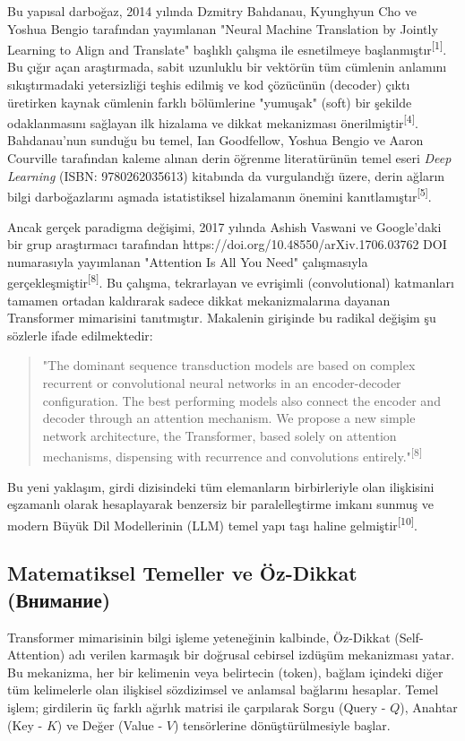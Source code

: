 \documentclass[11pt,a4paper]{article}
\begin{document}
Bu yapısal darboğaz, 2014 yılında Dzmitry Bahdanau, Kyunghyun Cho ve Yoshua Bengio tarafından yayımlanan "Neural Machine Translation by Jointly Learning to Align and Translate" başlıklı çalışma ile esnetilmeye başlanmıştır\textsuperscript{[1]}. Bu çığır açan araştırmada, sabit uzunluklu bir vektörün tüm cümlenin anlamını sıkıştırmadaki yetersizliği teşhis edilmiş ve kod çözücünün (decoder) çıktı üretirken kaynak cümlenin farklı bölümlerine "yumuşak" (soft) bir şekilde odaklanmasını sağlayan ilk hizalama ve dikkat mekanizması önerilmiştir\textsuperscript{[4]}. Bahdanau'nun sunduğu bu temel, Ian Goodfellow, Yoshua Bengio ve Aaron Courville tarafından kaleme alınan derin öğrenme literatürünün temel eseri \textit{Deep Learning} (ISBN: 9780262035613) kitabında da vurgulandığı üzere, derin ağların bilgi darboğazlarını aşmada istatistiksel hizalamanın önemini kanıtlamıştır\textsuperscript{[5]}.

Ancak gerçek paradigma değişimi, 2017 yılında Ashish Vaswani ve Google'daki bir grup araştırmacı tarafından https://doi.org/10.48550/arXiv.1706.03762 DOI numarasıyla yayımlanan "Attention Is All You Need" çalışmasıyla gerçekleşmiştir\textsuperscript{[8]}. Bu çalışma, tekrarlayan ve evrişimli (convolutional) katmanları tamamen ortadan kaldırarak sadece dikkat mekanizmalarına dayanan Transformer mimarisini tanıtmıştır. Makalenin girişinde bu radikal değişim şu sözlerle ifade edilmektedir:

\begin{quote}
"The dominant sequence transduction models are based on complex recurrent or convolutional neural networks in an encoder-decoder configuration. The best performing models also connect the encoder and decoder through an attention mechanism. We propose a new simple network architecture, the Transformer, based solely on attention mechanisms, dispensing with recurrence and convolutions entirely."\textsuperscript{[8]}
\end{quote}
Bu yeni yaklaşım, girdi dizisindeki tüm elemanların birbirleriyle olan ilişkisini eşzamanlı olarak hesaplayarak benzersiz bir paralelleştirme imkanı sunmuş ve modern Büyük Dil Modellerinin (LLM) temel yapı taşı haline gelmiştir\textsuperscript{[10]}.

\subsection{Matematiksel Temeller ve Öz-Dikkat (Внимание)}
Transformer mimarisinin bilgi işleme yeteneğinin kalbinde, Öz-Dikkat (Self-Attention) adı verilen karmaşık bir doğrusal cebirsel izdüşüm mekanizması yatar. Bu mekanizma, her bir kelimenin veya belirtecin (token), bağlam içindeki diğer tüm kelimelerle olan ilişkisel sözdizimsel ve anlamsal bağlarını hesaplar. Temel işlem; girdilerin üç farklı ağırlık matrisi ile çarpılarak Sorgu (Query - \(Q\)), Anahtar (Key - \(K\)) ve Değer (Value - \(V\)) tensörlerine dönüştürülmesiyle başlar.
\end{document}
